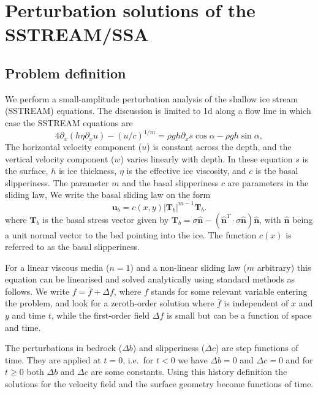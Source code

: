 \documentclass[10pt,a4paper]{book}
\newcommand{\p}{\partial}
\newcommand{\normal}{\hat{\bm{n}}}
\begin{document}
\chapter{Perturbation solutions of the SSTREAM/SSA}

\section{Problem definition}
We perform a small-amplitude perturbation analysis of the shallow ice
stream (SSTREAM) equations. The discussion is limited to 1d along a
flow line in which case the SSTREAM equations are
\begin{equation}
4 \p_x (h \eta \p_x u)  - (u/c)^{1/m}
=\rho g h \p_x s \cos \alpha  - \rho g h \sin \alpha ,\label{eq:Mcx} 
\end{equation}
The horizontal velocity component ($u$) is constant across the depth,
and the vertical velocity component ($w$) varies linearly with depth.
In these equation $s$ is the surface, $h$ is ice thickness, $\eta$ is
the effective ice viscosity, and $c$ is the basal slipperiness. The
parameter $m$ and the basal slipperiness $c$ are parameters in the
sliding law, We write the basal sliding law on the form
\begin{equation}
\mathbf{u}_b=c(x,y) |\mathbf{T}_b|^{m-1} \mathbf{T}_b.
\label{eq:slidlaw}
\end{equation}
where $\mathbf{T}_b$ is the basal stress vector given by
$\mathbf{T}_b=\sigma
\normal-(\normal^T \cdot \sigma \normal)
\normal$, with $\normal$ being a unit normal vector to the bed pointing into the
ice. The function $c(x)$ is referred to as the basal slipperiness.

For a linear viscous media ($n=1$) and a non-linear sliding law ($m$
arbitrary) this equation can be linearised and solved analytically
using standard methods as follows.  We write $f=\bar{f}+\Delta f$,
where $f$ stands for some relevant variable entering the problem, and
look for a zeroth-order solution where $\bar{f}$ is independent of $x$
and $y$ and time $t$, while the first-order field $\Delta f$ is small
but can be a function of space and time.  

The perturbations in bedrock ($\Delta b$) and slipperiness ($\Delta
c$) are step functions of time. They are applied at $t=0$, i.e.\ for
$t<0$ we have $\Delta b=0$ and $\Delta c=0$ and for $t \ge 0$ both
$\Delta b$ and $\Delta c$ are some constants.  Using this history
definition the solutions for the velocity field and the surface
geometry become functions of time.
\end{document}
